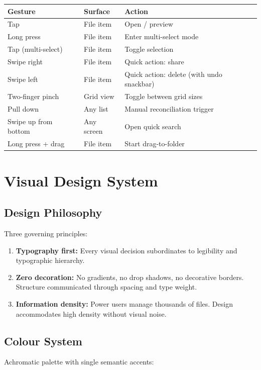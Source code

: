 \begin{longtable}{@{}p{40mm}p{35mm}p{60mm}@{}}
\toprule
\textbf{Gesture} & \textbf{Surface} & \textbf{Action} \\
\midrule
Tap & File item & Open / preview \\
Long press & File item & Enter multi-select mode \\
Tap (multi-select) & File item & Toggle selection \\
Swipe right & File item & Quick action: share \\
Swipe left & File item & Quick action: delete (with undo snackbar) \\
Two-finger pinch & Grid view & Toggle between grid sizes \\
Pull down & Any list & Manual reconciliation trigger \\
Swipe up from bottom & Any screen & Open quick search \\
Long press + drag & File item & Start drag-to-folder \\
\bottomrule
\end{longtable}

\chapter{Visual Design System}

\section{Design Philosophy}

Three governing principles:
\begin{enumerate}
  \item \textbf{Typography first:} Every visual decision subordinates to legibility and typographic hierarchy.
  \item \textbf{Zero decoration:} No gradients, no drop shadows, no decorative borders. Structure communicated through spacing and type weight.
  \item \textbf{Information density:} Power users manage thousands of files. Design accommodates high density without visual noise.
\end{enumerate}

\section{Colour System}

Achromatic palette with single semantic accents:

